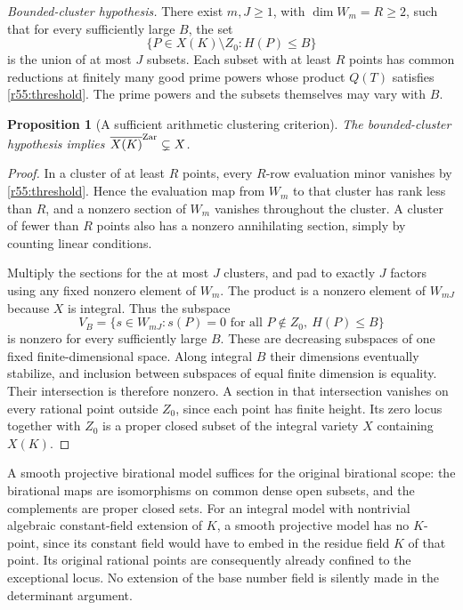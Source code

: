 \documentclass[11pt,a4paper]{article}
\newtheorem{notebookproposition}[notebooklemma]{Proposition}
\numberwithin{equation}{section}
\begin{document}
\emph{Bounded-cluster hypothesis.} There exist $m,J\geq1$, with $\dim W_m=R\geq2$, such that for every sufficiently large $B$, the set
\[
 \{P\in X(K)\setminus Z_0:H(P)\leq B\}
\]
is the union of at most $J$ subsets. Each subset with at least $R$ points has common reductions at finitely many good prime powers whose product $Q(T)$ satisfies \eqref{r55:threshold}. The prime powers and the subsets themselves may vary with $B$.

\begin{notebookproposition}[A sufficient arithmetic clustering criterion]\label{r55:criterion}
The bounded-cluster hypothesis implies $\overline{X(K)}^{\rm Zar}\subsetneq X$.
\end{notebookproposition}
\begin{proof}
In a cluster of at least $R$ points, every $R$-row evaluation minor vanishes by \eqref{r55:threshold}. Hence the evaluation map from $W_m$ to that cluster has rank less than $R$, and a nonzero section of $W_m$ vanishes throughout the cluster. A cluster of fewer than $R$ points also has a nonzero annihilating section, simply by counting linear conditions.

Multiply the sections for the at most $J$ clusters, and pad to exactly $J$ factors using any fixed nonzero element of $W_m$. The product is a nonzero element of $W_{mJ}$ because $X$ is integral. Thus the subspace
\[
 V_B=\{s\in W_{mJ}:s(P)=0\text{ for all }P\notin Z_0,
                                  \ H(P)\leq B\}
\]
is nonzero for every sufficiently large $B$. These are decreasing subspaces of one fixed finite-dimensional space. Along integral $B$ their dimensions eventually stabilize, and inclusion between subspaces of equal finite dimension is equality. Their intersection is therefore nonzero. A section in that intersection vanishes on every rational point outside $Z_0$, since each point has finite height. Its zero locus together with $Z_0$ is a proper closed subset of the integral variety $X$ containing $X(K)$.
\end{proof}

A smooth projective birational model suffices for the original birational scope: the birational maps are isomorphisms on common dense open subsets, and the complements are proper closed sets. For an integral model with nontrivial algebraic constant-field extension of $K$, a smooth projective model has no $K$-point, since its constant field would have to embed in the residue field $K$ of that point. Its original rational points are consequently already confined to the exceptional locus. No extension of the base number field is silently made in the determinant argument.
\end{document}
